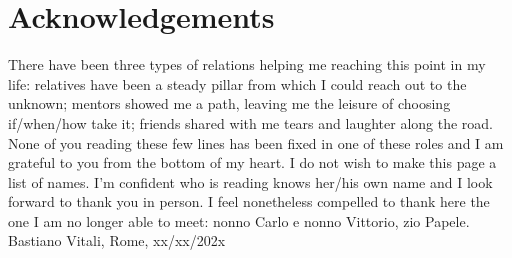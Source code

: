 \thispagestyle{plain}			%
\section*{Acknowledgements}
There have been three types of relations helping me reaching this point in my life: relatives have been a steady pillar from which I could reach out to the unknown; mentors showed me a path, leaving me the leisure of choosing if/when/how take it; friends shared with me tears and laughter along the road.
None of you reading these few lines has been fixed in one of these roles and I am grateful to you from the bottom of my heart.
I do not wish to make this page a list of names. I'm confident who is reading knows her/his own name and I look forward to thank you in person.  I feel nonetheless compelled to thank here the one I am no longer able to meet: nonno Carlo e nonno Vittorio, zio Papele.\\
\vspace{1.5cm}
\hfill
Bastiano Vitali, Rome, xx/xx/202x

\newpage				%
\thispagestyle{empty}
\mbox{}